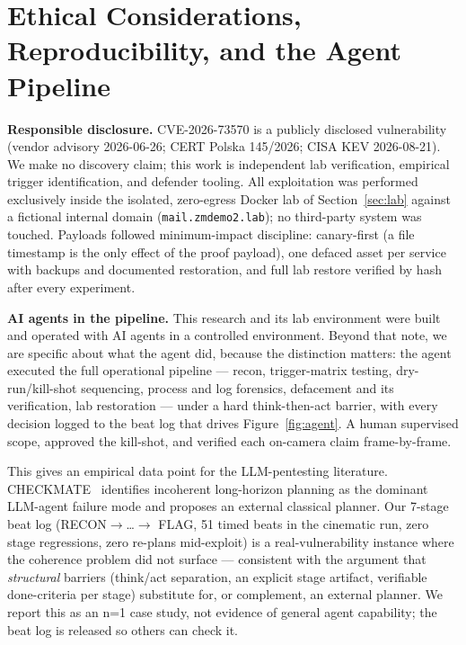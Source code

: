 \section{Ethical Considerations, Reproducibility, and the Agent Pipeline}
\label{sec:ethics}

\textbf{Responsible disclosure.} CVE-2026-73570 is a publicly disclosed
vulnerability (vendor advisory 2026-06-26; CERT Polska 145/2026; CISA KEV
2026-08-21). We make no discovery claim; this work is independent lab
verification, empirical trigger identification, and defender tooling. All
exploitation was performed exclusively inside the isolated, zero-egress
Docker lab of Section~\ref{sec:lab} against a fictional internal domain
(\texttt{mail.zmdemo2.lab}); no third-party system was touched. Payloads
followed minimum-impact discipline: canary-first (a file timestamp is the
only effect of the proof payload), one defaced asset per service with
backups and documented restoration, and full lab restore verified by hash
after every experiment.

\textbf{AI agents in the pipeline.} This research and its lab environment
were built and operated with AI agents in a controlled environment.
Beyond that note, we are specific about what the agent did, because the
distinction matters: the agent executed the full operational pipeline —
recon, trigger-matrix testing, dry-run/kill-shot sequencing, process and
log forensics, defacement and its verification, lab restoration — under a
hard think-then-act barrier, with every decision logged to the beat log
that drives Figure~\ref{fig:agent}. A human supervised scope, approved the
kill-shot, and verified each on-camera claim frame-by-frame.

This gives an empirical data point for the LLM-pentesting literature.
CHECKMATE~\cite{wang2025checkmate} identifies incoherent long-horizon
planning as the dominant LLM-agent failure mode and proposes an external
classical planner. Our 7-stage beat log (RECON$\rightarrow$\dots$\rightarrow$
FLAG, 51 timed beats in the cinematic run, zero stage regressions, zero
re-plans mid-exploit) is a real-vulnerability instance where the coherence
problem did not surface — consistent with the argument that
\emph{structural} barriers (think/act separation, an explicit stage
artifact, verifiable done-criteria per stage) substitute for, or complement,
an external planner. We report this as an n=1 case study, not evidence of
general agent capability; the beat log is released so others can check it.


